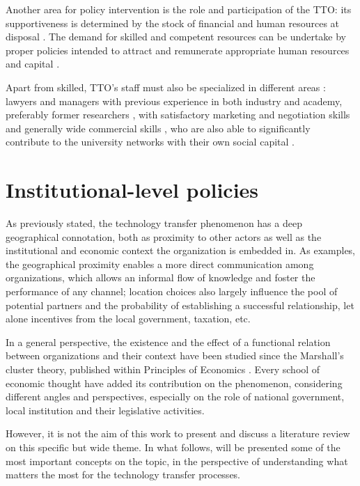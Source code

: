 Another area for policy intervention is the role and participation of the TTO: its supportiveness is determined by the stock of financial and human resources at disposal \citep{Siegel2007}. The demand for skilled and competent resources can be undertake by proper policies intended to attract and remunerate appropriate human resources and capital \citep{Rasmussen2006}.

Apart from skilled, TTO's staff must also be specialized in different areas \citep{Guerrero2014}: lawyers and managers with previous experience in both industry and academy, preferably former researchers \citep{Debackere2005}, with satisfactory marketing and negotiation skills \citep{Siegel2003a} and generally wide commercial skills \citep{Siegel2007}, who are also able to significantly contribute to the university networks with their own social capital \citep{Geuna2009}.

\section{Institutional-level policies}

As previously stated, the technology transfer phenomenon has a deep geographical connotation, both as proximity to other actors as well as the institutional and economic context the organization is embedded in. As examples, the geographical proximity enables a more direct communication among organizations, which allows an informal flow of knowledge and foster the performance of any channel; location choices also largely influence the pool of potential partners and the probability of establishing a successful relationship, let alone incentives from the local government, taxation, etc.

In a general perspective, the existence and the effect of a functional relation between organizations and their context have been studied since the Marshall's cluster theory, published within Principles of Economics \citep{Marshall1890}. Every school of economic thought have added its contribution on the phenomenon, considering different angles and perspectives, especially on the role of national government, local institution and their legislative activities.

However, it is not the aim of this work to present and discuss a literature review on this specific but wide theme. In what follows, will be presented some of the most important concepts on the topic, in the perspective of understanding what matters the most for the technology transfer processes.

